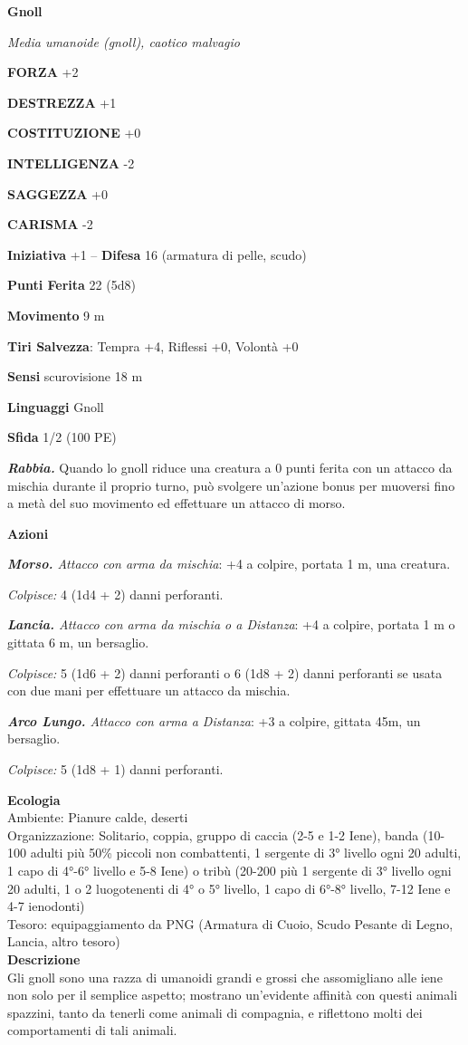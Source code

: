 \begin{multicols}{2}
\medskip{}\textbf{Gnoll}

\emph{Media umanoide (gnoll), caotico malvagio}

\textbf{FORZA} +2

\textbf{DESTREZZA} +1

\textbf{COSTITUZIONE} +0

\textbf{INTELLIGENZA} -2

\textbf{SAGGEZZA} +0

\textbf{CARISMA} -2

\textbf{Iniziativa} +1 -- \textbf{Difesa} 16 (armatura di pelle, scudo)

\textbf{Punti Ferita} 22 (5d8)

\textbf{Movimento} 9 m

\textbf{Tiri Salvezza}: Tempra +4, Riflessi +0, Volontà +0

\textbf{Sensi} scurovisione 18 m

\textbf{Linguaggi} Gnoll

\textbf{Sfida} 1/2 (100 PE)

\emph{\textbf{Rabbia.}} Quando lo gnoll riduce una creatura a 0 punti ferita con un attacco da mischia durante il proprio turno, può svolgere un'azione bonus per muoversi fino a metà del suo movimento ed effettuare un attacco di morso.

\textbf{Azioni}

\emph{\textbf{Morso.} Attacco con arma da mischia}: +4 a colpire, portata 1 m, una creatura.

\emph{Colpisce:} 4 (1d4 + 2) danni perforanti.

\emph{\textbf{Lancia.} Attacco con arma da mischia o a Distanza}: +4 a colpire, portata 1 m o gittata 6 m, un bersaglio.

\emph{Colpisce:} 5 (1d6 + 2) danni perforanti o 6 (1d8 + 2) danni perforanti se usata con due mani per effettuare un attacco da mischia.

\emph{\textbf{Arco Lungo.} Attacco con arma a Distanza}: +3 a colpire, gittata 45m, un bersaglio.

\emph{Colpisce:} 5 (1d8 + 1) danni perforanti.

\textbf{Ecologia}\\
Ambiente: Pianure calde, deserti\\
Organizzazione: Solitario, coppia, gruppo di caccia (2-5 e 1-2 Iene), banda (10-100 adulti più 50\% piccoli non combattenti, 1 sergente di 3° livello ogni 20 adulti, 1 capo di 4°-6° livello e 5-8 Iene) o tribù (20-200 più 1 sergente di 3° livello ogni 20 adulti, 1 o 2 luogotenenti di 4° o 5° livello, 1 capo di 6°-8° livello, 7-12 Iene e 4-7 ienodonti)\\
Tesoro: equipaggiamento da PNG (Armatura di Cuoio, Scudo Pesante di Legno, Lancia, altro tesoro)\\
\textbf{Descrizione}\\
Gli gnoll sono una razza di umanoidi grandi e grossi che assomigliano alle iene non solo per il semplice aspetto; mostrano un'evidente affinità con questi animali spazzini, tanto da tenerli come animali di compagnia, e riflettono molti dei comportamenti di tali animali.\\


\end{multicols}

